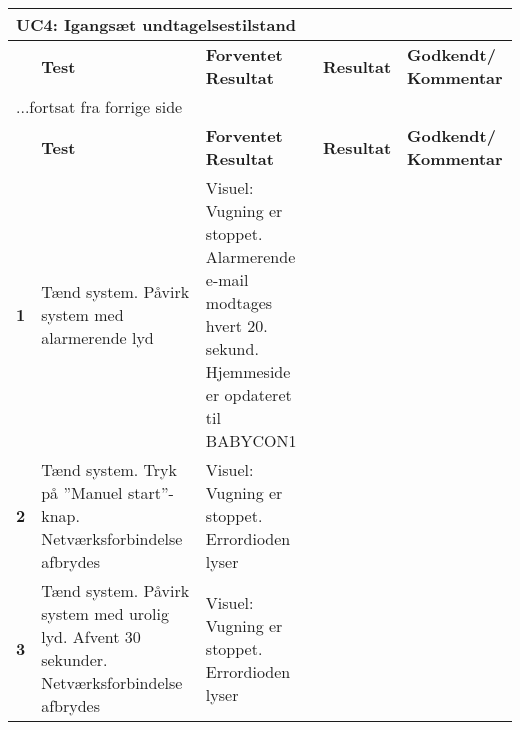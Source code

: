 \begin{center}
	\label{accepttest:uc4} 
\begin{longtable}{|p{}|p{}|p{}|p{}|p{}|} %
\hline
\multicolumn{5}{|l|}{\textbf{UC4: Igangsæt undtagelsestilstand}} \\ \hline
\multicolumn{1}{|c|}{} &
\textbf{Test} &
\textbf{Forventet \newline Resultat} &
\textbf{Resultat} &
\textbf{Godkendt/ \newline Kommentar} \\ \hline 
\endfirsthead

\multicolumn{5}{l}{...fortsat fra forrige side} \\ \hline 
\multicolumn{1}{|c|}{} &
\textbf{Test} &
\textbf{Forventet \newline Resultat} &
\textbf{Resultat} &
\textbf{Godkendt/ \newline Kommentar} \\ \hline 
\endhead



\textbf{1}	&Tænd system. Påvirk system med alarmerende lyd
			&Visuel: Vugning er stoppet. Alarmerende e-mail modtages hvert 20. sekund. Hjemmeside er opdateret til BABYCON1
			&
			&
			\\\hline
			
\textbf{2}  &Tænd system. Tryk på ''Manuel start''-knap. Netværksforbindelse afbrydes
			&Visuel: Vugning er stoppet. Errordioden lyser
			&
			&
			\\\hline	
			
\textbf{3}  &Tænd system. Påvirk system med urolig lyd. Afvent 30 sekunder. Netværksforbindelse afbrydes
			&Visuel: Vugning er stoppet. Errordioden lyser
			&
			&
			\\\hline	

\end{longtable}
\end{center}